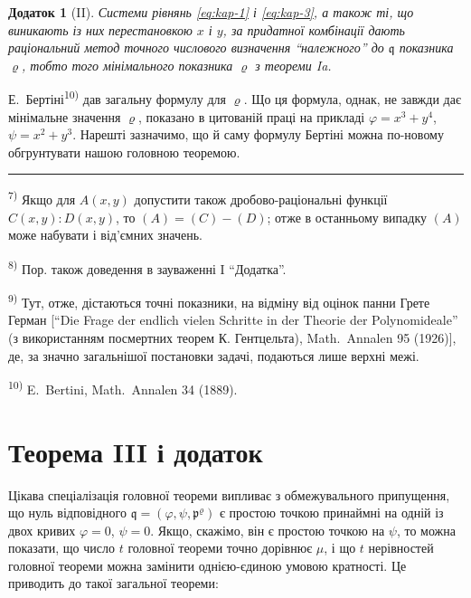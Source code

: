 \documentclass[11pt]{article}
\newcommand{\foreign}[1]{#1}
\theoremstyle{plain}
\newtheorem{zusatz}{Додаток}
\begin{document}
\begin{zusatz}[II]
Системи рівнянь \eqref{eq:kap-1} і \eqref{eq:kap-3}, а також ті, що
виникають із них перестановкою $x$ і $y$, за придатної комбінації
дають раціональний метод точного числового визначення ``належного''
до $\mathfrak{q}$ показника $\varrho$, тобто того мінімального
показника $\varrho$ з теореми Ia.
\end{zusatz}

Е.\ Бертіні\textsuperscript{10)} дав загальну формулу для $\varrho$.
Що ця формула, однак, не завжди дає мінімальне значення $\varrho$,
показано в цитованій праці на прикладі
$\varphi = x^{3} + y^{4}$, $\psi = x^{2} + y^{3}$. Нарешті зазначимо,
що й саму формулу Бертіні можна по-новому обгрунтувати нашою
головною теоремою.

\vspace{0.5em}
\noindent\rule{\textwidth}{0.4pt}
\vspace{0.3em}

{\footnotesize
\textsuperscript{7)} Якщо для $A(x,y)$ допустити також дробово-раціональні
функції $C(x,y):D(x,y)$, то $(A) = (C) - (D)$; отже в останньому
випадку $(A)$ може набувати і від'ємних значень.

\textsuperscript{8)} Пор. також доведення в зауваженні I ``Додатка''.

\textsuperscript{9)} Тут, отже, дістаються точні показники, на відміну від
оцінок панни Грете Герман [``Die Frage der endlich vielen Schritte
in der Theorie der Polynomideale'' (з використанням посмертних
теорем К. Гентцельта), \foreign{Math.\ Annalen} 95 (1926)], де, за
значно загальнішої постановки задачі, подаються лише верхні межі.

\textsuperscript{10)} E.\ Bertini, \foreign{Math.\ Annalen} 34 (1889).
}

\newpage
\section*{Теорема III і додаток}

Цікава спеціалізація головної теореми випливає з обмежувального
припущення, що нуль відповідного
$\mathfrak{q} = (\varphi, \psi, \mathfrak{p}^\varrho)$ є простою
точкою принаймні на одній із двох кривих $\varphi = 0$, $\psi = 0$.
Якщо, скажімо, він є простою точкою на $\psi$, то можна показати,
що число $t$ головної теореми точно дорівнює $\mu$, і що $t$
нерівностей головної теореми можна замінити однією-єдиною умовою
кратності. Це приводить до такої загальної теореми:
\end{document}
